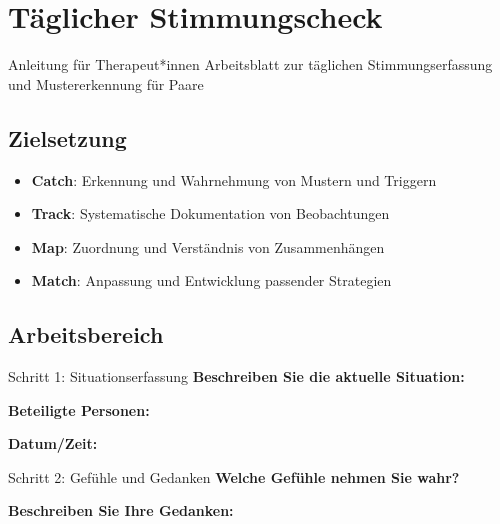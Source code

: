 
\section{Täglicher Stimmungscheck}
\label{sec:arbeitsblatt-taeglicher-stimmungscheck}

\begin{ctmmBlueBox}{Anleitung für Therapeut*innen}
Arbeitsblatt zur täglichen Stimmungserfassung und Mustererkennung für Paare
\end{ctmmBlueBox}

\subsection{Zielsetzung}
\begin{itemize}
    \item \textbf{Catch}: Erkennung und Wahrnehmung von Mustern und Triggern
    \item \textbf{Track}: Systematische Dokumentation von Beobachtungen
    \item \textbf{Map}: Zuordnung und Verständnis von Zusammenhängen
    \item \textbf{Match}: Anpassung und Entwicklung passender Strategien
\end{itemize}

\subsection{Arbeitsbereich}

\begin{ctmmGreenBox}{Schritt 1: Situationserfassung}
\textbf{Beschreiben Sie die aktuelle Situation:}


\vspace{0.5cm}
\textbf{Beteiligte Personen:}

\textbf{Datum/Zeit:}
\end{ctmmGreenBox}

\vspace{1cm}

\begin{ctmmBlueBox}{Schritt 2: Gefühle und Gedanken}
\textbf{Welche Gefühle nehmen Sie wahr?}


\vspace{0.5cm}
\textbf{Beschreiben Sie Ihre Gedanken:}
\end{ctmmBlueBox}

